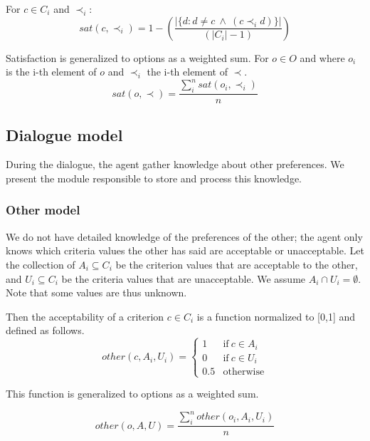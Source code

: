 \documentclass{llncs}
\begin{document}
	For $c \in C_i$ and $\prec_i$:
	\begin{equation}
	sat(c, \prec_i) =	1 - \left( \frac{|\{d : d \neq c \  \wedge \ (c \prec_i d)\}| }{( |C_i| - 1 )}\right)
	\end{equation}
	
	
	Satisfaction is generalized to options as a weighted sum.
	For $o \in O$ and where $o_i$ is the i-th element of $o$ and $\prec_i$ the i-th element of $\prec$.
	\begin{equation}
	sat(o, \prec) = \frac{\sum_{i}^{n} sat(o_i, \prec_i) }{n}
	\end{equation}
	
	
	
	\subsection{Dialogue model}
	During the dialogue, the agent gather knowledge about other preferences. We present the module responsible to store and process this knowledge. 
	
	\subsubsection{Other model}
	We do not have detailed knowledge of the preferences of the other; the agent only knows which criteria values the other has said are acceptable or unacceptable.				
	Let the collection of $A_i \subseteq C_i$ be the criterion values that are acceptable to the other, and $U_i \subseteq C_i$ be the criteria values that are unacceptable.  We assume $A_i \cap U_i = \emptyset$.  Note	that some values are thus unknown.
	
	Then the acceptability of a criterion $c \in C_i$ is a function normalized to [0,1] and defined as follows.
	\begin{equation}
	other(c, A_i, U_i)= \left\{\begin{array}{ll}
	1	 & \mathrm{if\ }  c \in A_i\\
	0    & \mathrm{if\ }c \in U_i\\
	0.5	 & \mathrm{otherwise}
	\end{array}\right.
	\end{equation}
	
	
	This function is generalized to options as a weighted sum.
	
	\begin{equation}
	other(o, A, U) = \frac{ \sum_{i}^{n} other(o_i, A_i, U_i) } {n}
	\end{equation}
	
\end{document}
